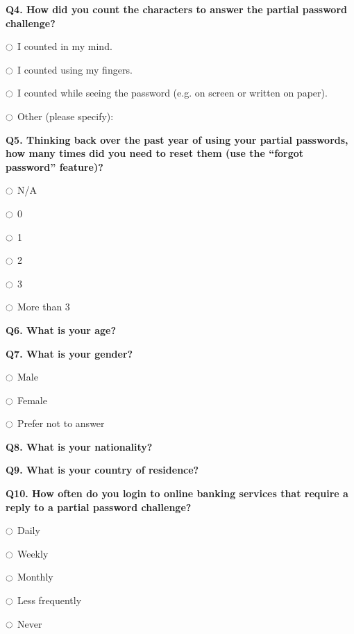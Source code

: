 {    \textbf{Q4. How did you count the characters to answer the partial password challenge?}
    \begin{shortitemize}
      \item[$\ocircle$] I counted in my mind.
      \item[$\ocircle$] I counted using my fingers.
      \item[$\ocircle$] I counted while seeing the password (e.g. on screen or written on paper).
      \item[$\ocircle$] Other (please specify): \ovalbox{\phantom{A box for some explanation goes here}}
    \end{shortitemize}

    \textbf{Q5. Thinking back over the past year of using your partial passwords, how many times did you need to reset them (use the ``forgot password'' feature)?}
    \begin{shortitemize}
      \item[$\ocircle$] N/A
      \item[$\ocircle$] 0
      \item[$\ocircle$] 1
      \item[$\ocircle$] 2
      \item[$\ocircle$] 3
      \item[$\ocircle$] More than 3
    \end{shortitemize}

    \textbf{Q6. What is your age?} \ovalbox{\phantom{box here}}

    \textbf{Q7. What is your gender?}
    \begin{shortitemize}
      \item[$\ocircle$] Male
      \item[$\ocircle$] Female
      \item[$\ocircle$] Prefer not to answer
    \end{shortitemize}

    \textbf{Q8. What is your nationality?} \ovalbox{\phantom{A box goes here}}

    \textbf{Q9. What is your country of residence?} \ovalbox{\phantom{A box goes here}}

    \textbf{Q10. How often do you login to online banking services that require a reply to a partial password challenge?}
    \begin{shortitemize}
      \item[$\ocircle$] Daily
      \item[$\ocircle$] Weekly
      \item[$\ocircle$] Monthly
      \item[$\ocircle$] Less frequently
      \item[$\ocircle$] Never
    \end{shortitemize}
    }

